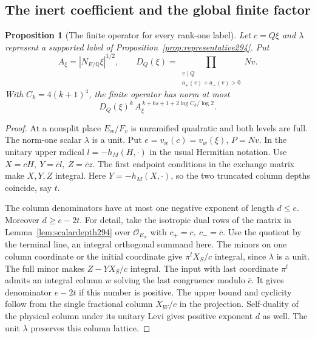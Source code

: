 \documentclass[a4paper,11pt]{article}
\newtheorem{proposition}{Proposition}[section]
\theoremstyle{definition}
\theoremstyle{remark}
\numberwithin{equation}{section}
\begin{document}
\subsection{The inert coefficient and the global finite factor}\label{nav:III-59}
\begin{proposition}[The finite operator for every rank-one label]\leavevmode
\label{prop:finiteall294}
Let \(c=Q\xi\) and \(\lambda\) represent a supported label
of Proposition~\ref{prop:representative294}. Put
\[
  A_\xi=|N_{E/\mathbb Q}\xi|^{1/2},\qquad
  D_Q(\xi)=\prod_{\substack{v\mid Q\\a_+(v)+a_-(v)>0}}Nv .
\]
With \(C_k=4(k+1)^4\), the finite operator has norm at most
\[
       D_Q(\xi)^k\,
       A_\xi^{\,k+6s+1+2\log C_k/\log2}.
\]
\end{proposition}
\begin{proof}
At a nonsplit place \(E_w/F_v\) is unramified quadratic
and both levels are full. The norm-one scalar \(\lambda\)
is a unit. Put \(e=v_w(c)=v_w(\xi)\), \(P=Nv\). In the
unitary upper radical \(l=-h_M(H,\cdot)\) in the usual
Hermitian notation. Use \(X=cH,\ Y=\bar c l,\ Z=\bar c z\).
The first endpoint conditions in the exchange matrix
make \(X,Y,Z\) integral. Here \(Y=-h_M(X,\cdot)\), so
the two truncated column depths coincide, say \(t\).

The column denominators have at most one negative exponent
of length \(d\le e\). Moreover \(d\ge e-2t\).
For detail, take the isotropic dual rows of the matrix
in Lemma~\ref{lem:scalardepth294} over \(\mathcal O_{E_w}\)
with \(c_+=c,\ c_-=\bar c\). Use the quotient by the
terminal line, an integral orthogonal summand here. The
minors on one column coordinate or the initial coordinate
give \(\pi^t X_S/c\) integral, since \(\lambda\) is a
unit. The full minor makes \(Z-YX_S/c\) integral. The
input with last coordinate \(\pi^t\) admits an integral
column \(w\) solving the last congruence modulo \(\bar c\).
It gives denominator \(e-2t\) if this number is positive.
The upper bound and cyclicity follow from the single
fractional column \(X_W/c\) in the projection. Self-duality
of the physical column under its unitary Levi gives
positive exponent \(d\) as well. The unit \(\lambda\)
preserves this column lattice.


\end{proof}
\end{document}
